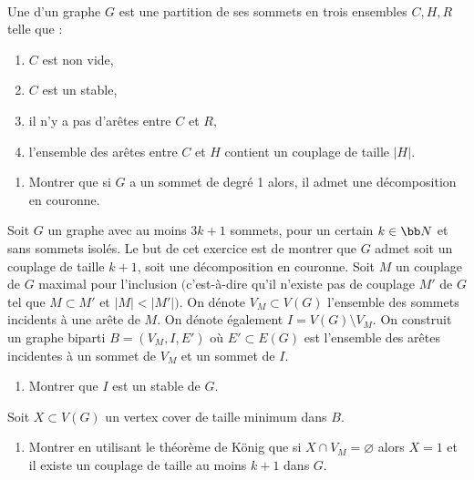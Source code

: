 \begin{td-exo}\,\\
    Une  d'un graphe \(G\) est une partition de ses sommets en trois ensembles \(C, H, R\) telle que :
    \begin{enumerate}[label=(\roman*)]
        \item \(C\) est non vide,
        \item \(C\) est un stable,
        \item il n'y a pas d'ar\^etes entre \(C\) et \(R\),
        \item l'ensemble des ar\^etes entre \(C\) et \(H\) contient un couplage de taille \(\left| H \right|\).
    \end{enumerate}

    \begin{enumerate}
        \item Montrer que si \(G\) a un sommet de degr\'e 1 alors, il admet une d\'ecomposition en couronne.
    \end{enumerate}
    Soit \(G\) un graphe avec au moins \(3k + 1\) sommets, pour un certain \(k \in \bb N\) et sans sommets isol\'es.
    Le but de cet exercice est de montrer que \(G\) admet soit un couplage de taille \(k+1\), soit une d\'ecomposition en couronne.
    Soit \(M\) un couplage de \(G\) maximal pour l'inclusion \(\big(\)c'est-\`a-dire qu'il n'existe pas de couplage \(M'\) de \(G\) tel que \(M \subset M'\) et \(\left| M \right| < \left| M' \right|\big)\).
    On d\'enote \(V_M \subset V(G)\) l'ensemble des sommets incidents \`a une ar\^ete de \(M\).
    On d\'enote \'egalement \(I = V(G) \setminus V_M\).
    On construit un graphe biparti \(B = (V_M, I, E')\) o\`u \(E' \subset E(G)\) est l'ensemble des ar\^etes incidentes \`a un sommet de \(V_M\) et un sommet de \(I\).

    \begin{enumerate}[start=2]
        \item Montrer que \(I\) est un stable de \(G\).
    \end{enumerate}

    Soit \(X \subset V(G)\) un vertex cover de taille minimum dans \(B\).

    \begin{enumerate}[start=3]
        \item Montrer en utilisant le th\'eor\`eme de K\"onig que si \(X \cap V_M = \varnothing\) alors \(X = 1\) et il existe un couplage de taille au moins \(k + 1\) dans \(G\).


\end{enumerate}
\end{td-exo}

